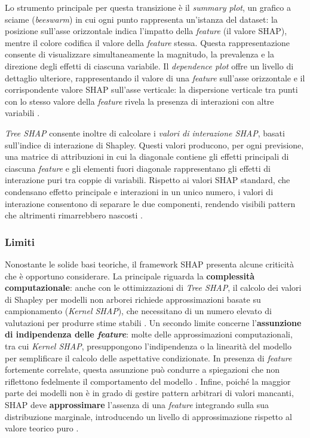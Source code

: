 Lo strumento principale per questa transizione è il \textit{summary plot}, un grafico a sciame (\textit{beeswarm}) in cui ogni punto rappresenta un'istanza del dataset: la posizione sull'asse orizzontale indica l'impatto della \textit{feature} (il valore SHAP), mentre il colore codifica il valore della \textit{feature} stessa. Questa rappresentazione consente di visualizzare simultaneamente la magnitudo, la prevalenza e la direzione degli effetti di ciascuna variabile. Il \textit{dependence plot} offre un livello di dettaglio ulteriore, rappresentando il valore di una \textit{feature} sull'asse orizzontale e il corrispondente valore SHAP sull'asse verticale: la dispersione verticale tra punti con lo stesso valore della \textit{feature} rivela la presenza di interazioni con altre variabili \cite{lundberg2019explainable}.

\textit{Tree SHAP} consente inoltre di calcolare i \textit{valori di interazione SHAP}, basati sull'indice di interazione di Shapley. Questi valori producono, per ogni previsione, una matrice di attribuzioni in cui la diagonale contiene gli effetti principali di ciascuna \textit{feature} e gli elementi fuori diagonale rappresentano gli effetti di interazione puri tra coppie di variabili. Rispetto ai valori SHAP standard, che condensano effetto principale e interazioni in un unico numero, i valori di interazione consentono di separare le due componenti, rendendo visibili pattern che altrimenti rimarrebbero nascosti \cite{lundberg2019explainable}.

\subsubsection{Limiti}

Nonostante le solide basi teoriche, il framework SHAP presenta alcune criticità che è opportuno considerare. La principale riguarda la \textbf{complessità computazionale}: anche con le ottimizzazioni di \textit{Tree SHAP}, il calcolo dei valori di Shapley per modelli non arborei richiede approssimazioni basate su campionamento (\textit{Kernel SHAP}), che necessitano di un numero elevato di valutazioni per produrre stime stabili \cite{lundberg2017unified}. Un secondo limite concerne l'\textbf{assunzione di indipendenza delle \textit{feature}}: molte delle approssimazioni computazionali, tra cui \textit{Kernel SHAP}, presuppongono l'indipendenza o la linearità del modello per semplificare il calcolo delle aspettative condizionate. In presenza di \textit{feature} fortemente correlate, questa assunzione può condurre a spiegazioni che non riflettono fedelmente il comportamento del modello \cite{lundberg2017unified}. Infine, poiché la maggior parte dei modelli non è in grado di gestire pattern arbitrari di valori mancanti, SHAP deve \textbf{approssimare} l'assenza di una \textit{feature} integrando sulla sua distribuzione marginale, introducendo un livello di approssimazione rispetto al valore teorico puro \cite{lundberg2017unified}.


